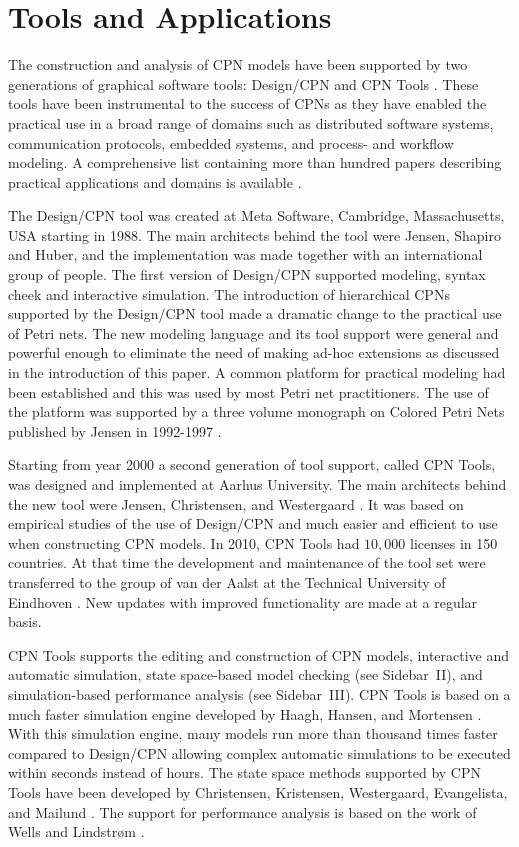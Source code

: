 \section{Tools and Applications}

The construction and analysis of CPN models have been supported by two
generations of graphical software tools: Design/CPN \cite{tacas97} and
CPN Tools \cite{cpn2003}. These tools have been instrumental to the
success of CPNs as they have enabled the practical use in a broad
range of domains such as distributed software systems, communication
protocols, embedded systems, and process- and workflow modeling. A
comprehensive list containing more than hundred papers describing
practical applications and domains is available \cite{cpnuse}.

The Design/CPN tool \cite{tacas97} was created at Meta Software,
Cambridge, Massachusetts, USA starting in 1988. The main architects
behind the tool were Jensen, Shapiro and Huber, and the implementation
was made together with an international group of people. The first
version of Design/CPN supported modeling, syntax cheek and interactive
simulation. The introduction of hierarchical CPNs supported by the
Design/CPN tool made a dramatic change to the practical use of Petri
nets. The new modeling language and its tool support were general and
powerful enough to eliminate the need of making ad-hoc extensions as
discussed in the introduction of this paper. A common platform for
practical modeling had been established and this was used by most
Petri net practitioners. The use of the platform was supported by a
three volume monograph on Colored Petri Nets published by Jensen in
1992-1997 \cite{jensen:cpnvols}.

Starting from year 2000 a second generation of tool support, called
CPN Tools, was designed and implemented at Aarhus University. The main
architects behind the new tool were Jensen, Christensen, and
Westergaard \cite{cpn2003}.  It was based on empirical studies of the
use of Design/CPN and much easier and efficient to use when
constructing CPN models. In 2010, CPN Tools had $10,000$ licenses in 150
countries. At that time the development and maintenance of the tool
set were transferred to the group of van der Aalst at the Technical
University of Eindhoven \cite{cpntoolsweb}. New updates with improved
functionality are made at a regular basis.

CPN Tools supports the editing and construction of CPN models,
interactive and automatic simulation, state space-based model checking
(see Sidebar~II), and simulation-based performance analysis (see
Sidebar~III). CPN Tools is based on a much faster simulation engine
developed by Haagh, Hansen, and Mortensen \cite{mortensen:01}. With
this simulation engine, many models run more than thousand times
faster compared to Design/CPN allowing complex automatic simulations
to be executed within seconds instead of hours. The state space
methods supported by CPN Tools have been developed by Christensen,
Kristensen, Westergaard, Evangelista, and Mailund
\cite{sweep,asap}. The support for performance
analysis is based on the work of Wells and Lindstr\o{}m
\cite{performance1}.

